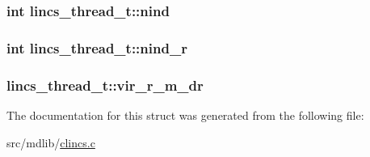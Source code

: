 \hypertarget{structlincs__thread__t_aad1b302849b981111129d04497119596}{
\subsubsection[{nind}]{\setlength{\rightskip}{0pt plus 5cm}int {\bf lincs\-\_\-thread\-\_\-t\-::nind}}}\label{structlincs__thread__t_aad1b302849b981111129d04497119596}
\hypertarget{structlincs__thread__t_a44ceb421605a59ae6db362e8d49128fc}{
\subsubsection[{nind\-\_\-r}]{\setlength{\rightskip}{0pt plus 5cm}int {\bf lincs\-\_\-thread\-\_\-t\-::nind\-\_\-r}}}\label{structlincs__thread__t_a44ceb421605a59ae6db362e8d49128fc}
\hypertarget{structlincs__thread__t_ad551562ec265846710f49720eeabc084}{
\subsubsection[{vir\-\_\-r\-\_\-m\-\_\-dr}]{ {\bf lincs\-\_\-thread\-\_\-t\-::vir\-\_\-r\-\_\-m\-\_\-dr}}}\label{structlincs__thread__t_ad551562ec265846710f49720eeabc084}


\-The documentation for this struct was generated from the following file\-:\begin{DoxyCompactItemize}
\item 
src/mdlib/\hyperlink{clincs_8c}{clincs.\-c}\end{DoxyCompactItemize}
